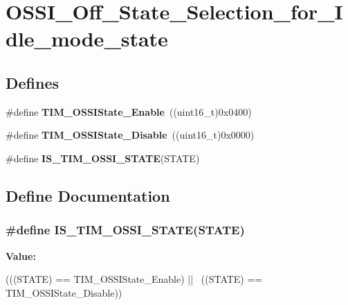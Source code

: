 \hypertarget{group__OSSI__Off__State__Selection__for__Idle__mode__state}{
\section{OSSI\_\-Off\_\-State\_\-Selection\_\-for\_\-Idle\_\-mode\_\-state}
\label{group__OSSI__Off__State__Selection__for__Idle__mode__state}
}
\subsection*{Defines}
\begin{DoxyCompactItemize}
\item 
\hypertarget{group__OSSI__Off__State__Selection__for__Idle__mode__state_gaf643ec0d2edb6c8fb725d00210b3d071}{
\#define {\bfseries TIM\_\-OSSIState\_\-Enable}~((uint16\_\-t)0x0400)}
\label{group__OSSI__Off__State__Selection__for__Idle__mode__state_gaf643ec0d2edb6c8fb725d00210b3d071}

\item 
\hypertarget{group__OSSI__Off__State__Selection__for__Idle__mode__state_gae1962736fd5cad82e97a5814ef6758bd}{
\#define {\bfseries TIM\_\-OSSIState\_\-Disable}~((uint16\_\-t)0x0000)}
\label{group__OSSI__Off__State__Selection__for__Idle__mode__state_gae1962736fd5cad82e97a5814ef6758bd}

\item 
\#define {\bfseries IS\_\-TIM\_\-OSSI\_\-STATE}(STATE)
\end{DoxyCompactItemize}


\subsection{Define Documentation}
\hypertarget{group__OSSI__Off__State__Selection__for__Idle__mode__state_gad24fc8836152903b408239284cecfab1}{
\subsubsection[{IS\_\-TIM\_\-OSSI\_\-STATE}]{\setlength{\rightskip}{0pt plus 5cm}\#define IS\_\-TIM\_\-OSSI\_\-STATE(STATE)}}
\label{group__OSSI__Off__State__Selection__for__Idle__mode__state_gad24fc8836152903b408239284cecfab1}
{\bfseries Value:}
\begin{DoxyCode}
(((STATE) == TIM_OSSIState_Enable) || \
                                  ((STATE) == TIM_OSSIState_Disable))
\end{DoxyCode}
